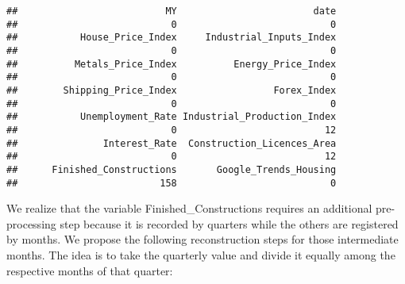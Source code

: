 \documentclass[
]{article}
\newenvironment{Shaded}{\begin{snugshade}}{\end{snugshade}}
\newcommand{\CommentTok}[1]{\textcolor[rgb]{0.56,0.35,0.01}{\textit{#1}}}
\newcommand{\FunctionTok}[1]{\textcolor[rgb]{0.13,0.29,0.53}{\textbf{#1}}}
\newcommand{\NormalTok}[1]{#1}
\newcommand{\OtherTok}[1]{\textcolor[rgb]{0.56,0.35,0.01}{#1}}
\newcommand{\SpecialCharTok}[1]{\textcolor[rgb]{0.81,0.36,0.00}{\textbf{#1}}}
\begin{document}
\begin{verbatim}
##                          MY                        date 
##                           0                           0 
##           House_Price_Index     Industrial_Inputs_Index 
##                           0                           0 
##          Metals_Price_Index          Energy_Price_Index 
##                           0                           0 
##        Shipping_Price_Index                 Forex_Index 
##                           0                           0 
##           Unemployment_Rate Industrial_Production_Index 
##                           0                          12 
##               Interest_Rate  Construction_Licences_Area 
##                           0                          12 
##      Finished_Constructions       Google_Trends_Housing 
##                         158                           0
\end{verbatim}

\begin{Shaded}
\end{Shaded}

We realize that the variable Finished\_Constructions requires an
additional pre-processing step because it is recorded by quarters while
the others are registered by months. We propose the following
reconstruction steps for those intermediate months. The idea is to take
the quarterly value and divide it equally among the respective months of
that quarter:
\end{document}
